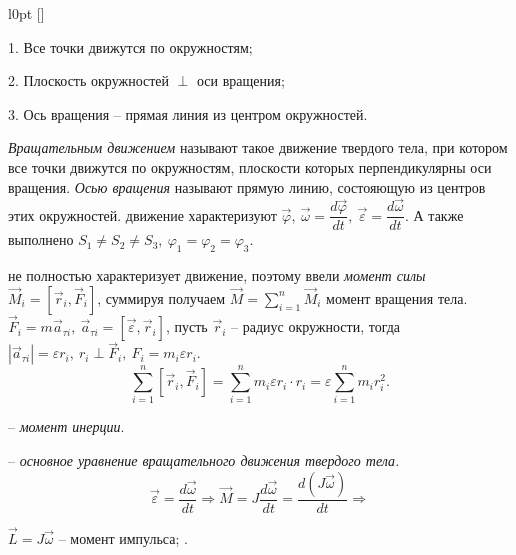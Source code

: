\documentclass[9pt]{article}
\begin{document}
\begin{wrapfigure}[8]{l}{0pt}
\raisebox{0pt}[\dimexpr{}\baselineskip\relax]{
}
\end{wrapfigure}

\par1. Все точки движутся по окружностям;
\par2. Плоскость окружностей \(\perp\) оси вращения;
\par3. Ось вращения -- прямая линия из центром окружностей.
\par\textit{Вращательным движением} называют такое движение твердого тела, при котором все точки движутся по окружностям, плоскости которых перпендикулярны оси вращения. \textit{Осью вращения} называют прямую линию, состояющую из центров этих окружностей.
 движение характеризуют \(\vec\varphi,\ \vec\omega=\dfrac{d\vec\varphi}{dt},\ \vec\varepsilon=\dfrac{d\vec\omega}{dt}\). А также выполнено \(S_1\neq S_2\neq S_3,\ \varphi_1=\varphi_2=\varphi_3\).
\par{}
 не полностью характеризует движение, поэтому ввели \textit{момент силы} \(\vec M_i=[\vec r_i, \vec F_i]\), суммируя получаем \(\vec M=\displaystyle\sum_{i=1}^n\vec M_i\) момент вращения тела. \(\vec F_i=m\vec a_{\tau i},\ \vec a_{\tau i}=[\vec\varepsilon, \vec r_i]\), пусть \(\vec r_i\) -- радиус окружности, тогда \(|\vec a_{\tau i}|=\varepsilon r_i,\ r_i\perp\vec F_i,\ F_i=m_i\varepsilon r_i\).\[\displaystyle\sum_{i=1}^n[\vec r_i, \vec F_i]=\sum_{i=1}^nm_i\varepsilon r_i\cdot r_i=\varepsilon\sum_{i=1}^nm_ir_i^2.\]
\par{} -- \textit{момент инерции}.
\par{} -- \textit{основное уравнение вращательного движения твердого тела.}
\[\vec\varepsilon=\dfrac{d\vec\omega}{dt}\Rightarrow\vec M=J\dfrac{d\vec\omega}{dt}=\dfrac{d(J\vec\omega)}{dt} \Rightarrow\]
\par\(\vec L=J\vec\omega\) -- момент импульса; .
\end{document}
